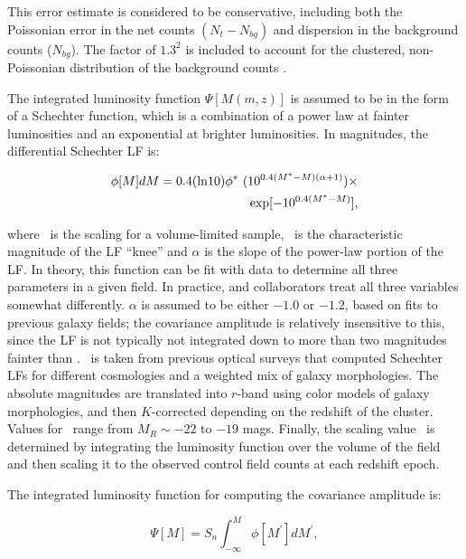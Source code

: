 \documentclass{emulateapj}
\begin{document}
\noindent This error estimate is considered to be conservative, including both the Poissonian error in the net counts $(N_t - N_{bg})$ and dispersion in the background counts ($N_{bg}$). The factor of $1.3^2$ is included to account for the clustered, non-Poissonian distribution of the background counts \citep{yee99}. 

The integrated luminosity function $\Psi[M(m,z)]$ is assumed to be in the form of a Schechter function, which is a combination of a power law at fainter luminosities and an exponential at brighter luminosities. In magnitudes, the differential Schechter LF is:

\begin{eqnarray}
\label{eqn:schechter}
\phi[M] dM = 0.4 ({\rm ln} 10) \phi^*~(10^{0.4(M^* - M)(\alpha + 1)}) \times \nonumber \\
{\rm exp}[-10^{0.4(M^*-M)}],
\end{eqnarray}

\noindent where \phistar~is the scaling for a volume-limited sample, \mstar~is the characteristic magnitude of the LF ``knee'' and $\alpha$ is the slope of the power-law portion of the LF. In theory, this function can be fit with data to determine all three parameters in a given field. In practice, \citet{yee87} and collaborators treat all three variables somewhat differently. $\alpha$ is assumed to be either $-1.0$ or $-1.2$, based on fits to previous galaxy fields; the covariance amplitude is relatively insensitive to this, since the LF is not typically not integrated down to more than two magnitudes fainter than \mstar. \mstar~is taken from previous optical surveys \citep{kin85,seb86} that computed Schechter LFs for different cosmologies and a weighted mix of galaxy morphologies. The absolute magnitudes are translated into $r$-band using color models of galaxy morphologies, and then $K$-corrected depending on the redshift of the cluster. Values for \mstar~range from $M_R\sim-22$ to $-19$ mags. Finally, the scaling value \phistar~is determined by integrating the luminosity function over the volume of the field and then scaling it to the observed control field counts at each redshift epoch. 

The integrated luminosity function for computing the covariance amplitude is:

\begin{equation}
\label{eqn:schechter_int}
\Psi[M] = S_n \int_{-\infty}^{M} \phi[M^\prime] dM^\prime, 
\end{equation}
\end{document}

